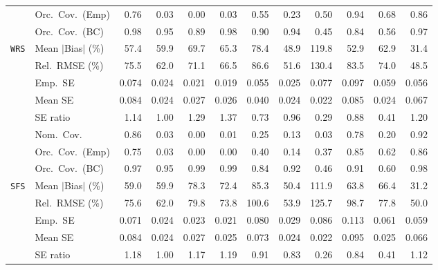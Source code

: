 \begin{landscape}
\begin{longtable}{llrrrrrrrrrr}
 & Orc.\ Cov.\ (Emp) & \cellcolor{rankthree}0.76 & 0.03 & 0.00 & 0.03 & 0.55 & 0.23 & 0.50 & \cellcolor{rankone}0.94 & 0.68 & \cellcolor{ranktwo}0.86 \\
 & Orc.\ Cov.\ (BC) & 0.98 & \cellcolor{rankone}0.95 & 0.89 & 0.98 & 0.90 & \cellcolor{ranktwo}0.94 & 0.45 & 0.84 & 0.56 & \cellcolor{rankthree}0.97 \\
\addlinespace[2pt]
\quad \texttt{WRS} & Mean $|$Bias$|$ (\%) & 57.4 & 59.9 & 69.7 & 65.3 & 78.4 & \cellcolor{ranktwo}48.9 & 119.8 & \cellcolor{rankthree}52.9 & 62.9 & \cellcolor{rankone}31.4 \\
 & Rel.\ RMSE (\%) & 75.5 & \cellcolor{rankthree}62.0 & 71.1 & 66.5 & 86.6 & \cellcolor{ranktwo}51.6 & 130.4 & 83.5 & 74.0 & \cellcolor{rankone}48.5 \\
 & Emp.\ SE & 0.074 & 0.024 & 0.021 & 0.019 & 0.055 & 0.025 & 0.077 & 0.097 & 0.059 & 0.056 \\
 & Mean SE & 0.084 & 0.024 & 0.027 & 0.026 & 0.040 & 0.024 & 0.022 & 0.085 & 0.024 & 0.067 \\
 & SE ratio & 1.14 & \cellcolor{rankone}1.00 & 1.29 & 1.37 & 0.73 & \cellcolor{ranktwo}0.96 & 0.29 & \cellcolor{rankthree}0.88 & 0.41 & 1.20 \\
 & Nom.\ Cov. & \cellcolor{ranktwo}0.86 & 0.03 & 0.00 & 0.01 & 0.25 & 0.13 & 0.03 & \cellcolor{rankthree}0.78 & 0.20 & \cellcolor{rankone}0.92 \\
 & Orc.\ Cov.\ (Emp) & \cellcolor{rankthree}0.75 & 0.03 & 0.00 & 0.00 & 0.40 & 0.14 & 0.37 & \cellcolor{ranktwo}0.85 & 0.62 & \cellcolor{rankone}0.86 \\
 & Orc.\ Cov.\ (BC) & \cellcolor{ranktwo}0.97 & \cellcolor{rankone}0.95 & 0.99 & 0.99 & 0.84 & \cellcolor{rankthree}0.92 & 0.46 & 0.91 & 0.60 & 0.98 \\
\addlinespace[2pt]
\quad \texttt{SFS} & Mean $|$Bias$|$ (\%) & \cellcolor{rankthree}59.0 & 59.9 & 78.3 & 72.4 & 85.3 & \cellcolor{ranktwo}50.4 & 111.9 & 63.8 & 66.4 & \cellcolor{rankone}31.2 \\
 & Rel.\ RMSE (\%) & 75.6 & \cellcolor{rankthree}62.0 & 79.8 & 73.8 & 100.6 & \cellcolor{ranktwo}53.9 & 125.7 & 98.7 & 77.8 & \cellcolor{rankone}50.0 \\
 & Emp.\ SE & 0.071 & 0.024 & 0.023 & 0.021 & 0.080 & 0.029 & 0.086 & 0.113 & 0.061 & 0.059 \\
 & Mean SE & 0.084 & 0.024 & 0.027 & 0.025 & 0.073 & 0.024 & 0.022 & 0.095 & 0.025 & 0.066 \\
 & SE ratio & 1.18 & \cellcolor{rankone}1.00 & 1.17 & 1.19 & \cellcolor{ranktwo}0.91 & 0.83 & 0.26 & 0.84 & 0.41 & \cellcolor{rankthree}1.12 \\

\end{longtable}
\end{landscape}
